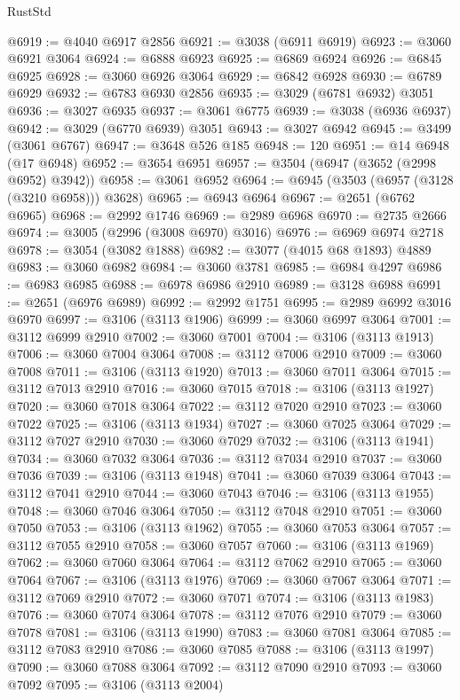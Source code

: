 \begin{lexlean}{RustStd}
\begin{coremodule}
@6919 := @4040 @6917 @2856
@6921 := @3038 (@6911 @6919)
@6923 := @3060 @6921 @3064
@6924 := @6888 @6923
@6925 := @6869 @6924
@6926 := @6845 @6925
@6928 := @3060 @6926 @3064
@6929 := @6842 @6928
@6930 := @6789 @6929
@6932 := @6783 @6930 @2856
@6935 := @3029 (@6781 @6932) @3051
@6936 := @3027 @6935
@6937 := @3061 @6775
@6939 := @3038 (@6936 @6937)
@6942 := @3029 (@6770 @6939) @3051
@6943 := @3027 @6942
@6945 := @3499 (@3061 @6767)
@6947 := @3648 @526 @185
@6948 := 120
@6951 := @14 @6948 (@17 @6948)
@6952 := @3654 @6951
@6957 := @3504 (@6947 (@3652 (@2998 @6952) @3942))
@6958 := @3061 @6952
@6964 := @6945 (@3503 (@6957 (@3128 (@3210 @6958))) @3628)
@6965 := @6943 @6964
@6967 := @2651 (@6762 @6965)
@6968 := @2992 @1746
@6969 := @2989 @6968
@6970 := @2735 @2666
@6974 := @3005 (@2996 (@3008 @6970) @3016)
@6976 := @6969 @6974 @2718
@6978 := @3054 (@3082 @1888)
@6982 := @3077 (@4015 @68 @1893) @4889
@6983 := @3060 @6982
@6984 := @3060 @3781
@6985 := @6984 @4297
@6986 := @6983 @6985
@6988 := @6978 @6986 @2910
@6989 := @3128 @6988
@6991 := @2651 (@6976 @6989)
@6992 := @2992 @1751
@6995 := @2989 @6992 @3016 @6970
@6997 := @3106 (@3113 @1906)
@6999 := @3060 @6997 @3064
@7001 := @3112 @6999 @2910
@7002 := @3060 @7001
@7004 := @3106 (@3113 @1913)
@7006 := @3060 @7004 @3064
@7008 := @3112 @7006 @2910
@7009 := @3060 @7008
@7011 := @3106 (@3113 @1920)
@7013 := @3060 @7011 @3064
@7015 := @3112 @7013 @2910
@7016 := @3060 @7015
@7018 := @3106 (@3113 @1927)
@7020 := @3060 @7018 @3064
@7022 := @3112 @7020 @2910
@7023 := @3060 @7022
@7025 := @3106 (@3113 @1934)
@7027 := @3060 @7025 @3064
@7029 := @3112 @7027 @2910
@7030 := @3060 @7029
@7032 := @3106 (@3113 @1941)
@7034 := @3060 @7032 @3064
@7036 := @3112 @7034 @2910
@7037 := @3060 @7036
@7039 := @3106 (@3113 @1948)
@7041 := @3060 @7039 @3064
@7043 := @3112 @7041 @2910
@7044 := @3060 @7043
@7046 := @3106 (@3113 @1955)
@7048 := @3060 @7046 @3064
@7050 := @3112 @7048 @2910
@7051 := @3060 @7050
@7053 := @3106 (@3113 @1962)
@7055 := @3060 @7053 @3064
@7057 := @3112 @7055 @2910
@7058 := @3060 @7057
@7060 := @3106 (@3113 @1969)
@7062 := @3060 @7060 @3064
@7064 := @3112 @7062 @2910
@7065 := @3060 @7064
@7067 := @3106 (@3113 @1976)
@7069 := @3060 @7067 @3064
@7071 := @3112 @7069 @2910
@7072 := @3060 @7071
@7074 := @3106 (@3113 @1983)
@7076 := @3060 @7074 @3064
@7078 := @3112 @7076 @2910
@7079 := @3060 @7078
@7081 := @3106 (@3113 @1990)
@7083 := @3060 @7081 @3064
@7085 := @3112 @7083 @2910
@7086 := @3060 @7085
@7088 := @3106 (@3113 @1997)
@7090 := @3060 @7088 @3064
@7092 := @3112 @7090 @2910
@7093 := @3060 @7092
@7095 := @3106 (@3113 @2004)

\end{coremodule}
\end{lexlean}
